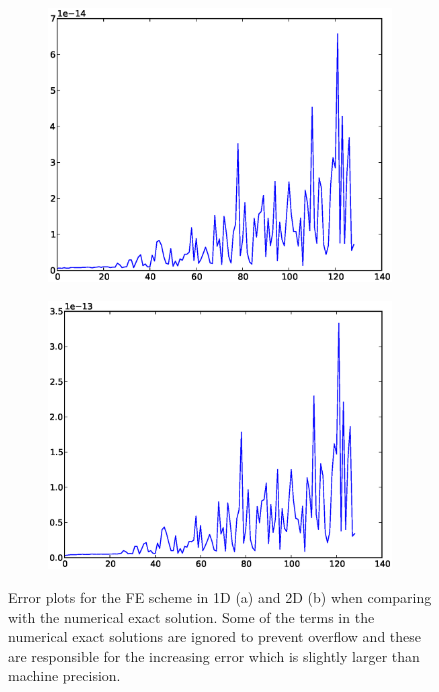 \begin{figure}[H]
 \centering
 \begin{subfigure}{0.49\textwidth}
 \includegraphics[width=\textwidth]{Figures/exact_numerical_1d_n130.eps}
  \caption{}
  \label{numerical_exact_FE:1D}
 \end{subfigure}
 \begin{subfigure}{0.49\textwidth}
 \includegraphics[width=\textwidth]{Figures/exact_numerical_2d_n130.eps}
  \caption{}
  \label{numerical_exact_FE:2D}
 \end{subfigure}
 \caption[Numerical exact error plots FE]{Error plots for the FE scheme in 1D (a) and 2D (b) when comparing with the numerical exact solution.
 Some of the terms in the numerical exact solutions are ignored to prevent overflow and these are responsible for the increasing error which is slightly larger than machine precision.}
 \label{numerical_exact_FE}
\end{figure}


